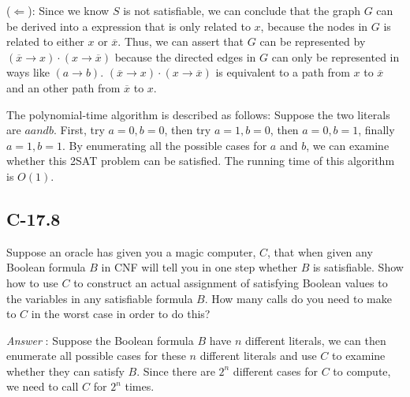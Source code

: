 \documentclass[11pt]{article}
\begin{document}
	($\Longleftarrow$): Since we know $S$ is not satisfiable, we can conclude that the graph $G$ can be derived into a expression that is only related to $x$, because the nodes in $G$ is related to either $x$ or $\overline{x}$. Thus, we can assert that $G$ can be represented by $(\overline{x}\rightarrow x)\cdot(x\rightarrow\overline{x})$ because the directed edges in $G$ can only be represented in ways like $(a\rightarrow b)$. $(\overline{x}\rightarrow x)\cdot(x\rightarrow\overline{x})$ is equivalent to a path from $x$ to $\overline{x}$ and an other path from $\overline{x}$ to $x$.
	
	The polynomial-time algorithm is described as follows: Suppose the two literals are $a and b $. First, try $a=0,b=0$, then try $a=1,b=0$, then $a=0,b=1$, finally $a=1,b=1$. By enumerating all the possible cases for $a$ and $b$, we can examine whether this 2SAT problem can be satisfied. The running time of this algorithm is $O(1)$.
\subsection{C-17.8}
Suppose an oracle has given you a magic computer, $C$, that when given any Boolean formula $B$ in CNF will tell you in one step whether $B$ is satisfiable. Show how to use $C$ to construct an actual assignment of satisfying Boolean values to the variables in any satisfiable formula $B$. How many calls do you need to make to $C$ in the worst case in order to do this?

\noindent\emph{Answer} : 
	Suppose the Boolean formula $B$ have $n$ different literals, we can then enumerate all possible cases for these $n$ different literals and use $C$ to examine whether they can satisfy $B$. Since there are $2^n$ different cases for $C$ to compute, we need to call $C$ for $2^n$ times.
\end{document}
